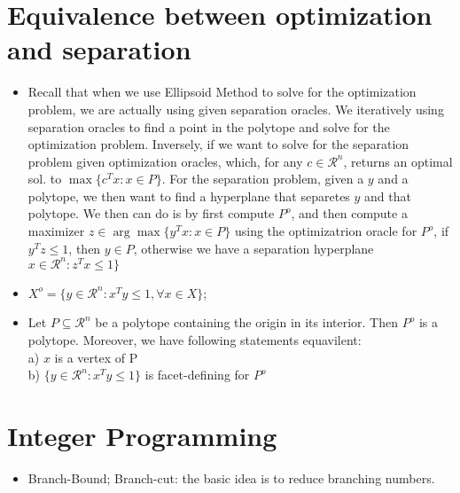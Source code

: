 \documentclass{article}
\begin{document}
\section{Equivalence between optimization and separation}
\begin{itemize}
\item Recall that when we use Ellipsoid Method to solve for the optimization problem, we are actually using given separation oracles. We iteratively using separation oracles to find a point in the polytope and solve for the optimization problem. Inversely, if we want to solve for the separation problem given optimization oracles, which, for any $c\in\mathcal{R}^n$, returns an optimal sol. to $\max\{c^Tx:x\in P\}$. For the separation problem, given a $y$ and a polytope, we then want to find a hyperplane that separetes $y$ and that polytope. We then can do is by first compute $P^o$, and then compute a maximizer $z\in\arg\max\{y^Tx:x\in P\}$ using the optimizatrion oracle for $P^o$, if $y^Tz\leq 1$, then $y\in P$, otherwise we have a separation hyperplane $x\in\mathcal{R}^n: z^Tx\leq 1\}$
\item $X^o=\{y\in\mathcal{R}^n: x^Ty\leq 1, \forall x\in X\}$;
\item Let $P\subseteq \mathcal{R}^n$ be a polytope containing the origin in its interior. Then $P^o$ is a polytope. Moreover, we have following statements equavilent:\\
a) $x$ is a vertex of P\\
b) $\{y\in\mathcal{R}^n:x^Ty\leq 1\}$ is facet-defining for $P^o$
\end{itemize}

\section{Integer Programming}
\begin{itemize}
\item Branch-Bound; Branch-cut: the basic idea is to reduce branching numbers.
\end{itemize}
\end{document}
